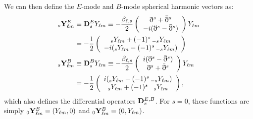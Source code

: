 \documentclass[usenatbib]{mnrasb}
\begin{document}
    We can then define the $E$-mode and $B$-mode spherical harmonic vectors as:
    \begin{align}\nonumber
      _s{\bf Y}^E_{\ell m}&\equiv {\bf D}^E_sY_{\ell m}
      \equiv-\frac{\beta_{\ell,s}}{2}\left(\begin{array}{c}
                              \eth^s+\bar{\eth}^s\\
                              -i(\eth^s-\bar{\eth}^s)
                            \end{array}\right)Y_{\ell m}\\\label{eq:ederiv}
        &=-\frac{1}{2}\left(\begin{array}{c}
                               _sY_{\ell m}+(-1)^s\,_{-s}Y_{\ell m}\\
                            -i(_sY_{\ell m}-(-1)^s\,_{-s}Y_{\ell m})
                            \end{array}\right) \\\nonumber
          _s{\bf Y}^B_{\ell m}&\equiv {\bf D}^B_sY_{\ell m}
          \equiv-\frac{\beta_{\ell,s}}{2}\left(\begin{array}{c}
                              i(\eth^s-\bar{\eth}^s)\\
                              \eth^s+\bar{\eth}^s
                            \end{array}\right)Y_{\ell m}\\\label{eq:bderiv}
        &=-\frac{1}{2}\left(\begin{array}{c}
                             i(_sY_{\ell m}-(-1)^s\,_{-s}Y_{\ell m})\\
                               _sY_{\ell m}+(-1)^s\,_{-s}Y_{\ell m}
                            \end{array}\right),
      \end{align}
      which also defines the differential operators ${\bf D}^{E,B}_s$. For $s=0$, these functions are simply $_0{\bf Y}^{E}_{\ell m}=(Y_{\ell m},0)$ and $_0{\bf Y}^{B}_{\ell m}=(0,Y_{\ell m})$.
      
\end{document}
